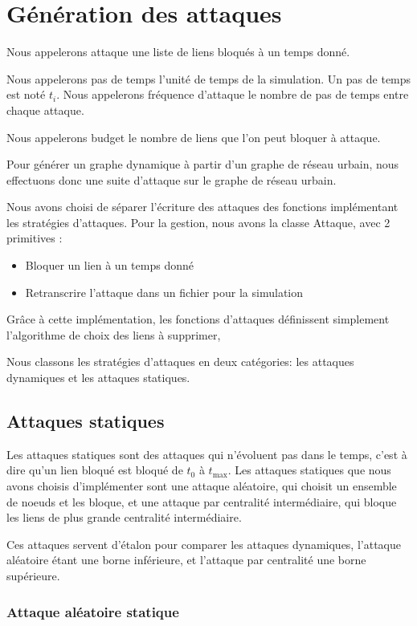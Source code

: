 \section{Génération des attaques}\label{sec:attaques}

Nous appelerons attaque une liste de liens bloqués à un temps donné.

Nous appelerons pas de temps l'unité de temps de la simulation. Un pas de temps est noté ${t_{i}}$. 
Nous appelerons fréquence d'attaque le nombre de pas de temps entre chaque attaque.

Nous appelerons budget le nombre de liens que l'on peut bloquer à attaque.

Pour générer un graphe dynamique à partir d'un graphe de réseau urbain, nous effectuons donc une suite d'attaque 
sur le graphe de réseau urbain.

Nous avons choisi de séparer l'écriture des attaques des fonctions implémentant les stratégies d'attaques.
Pour la gestion, nous avons la classe Attaque, avec 2 primitives :
\begin{itemize}
\item Bloquer un lien à un temps donné
\item Retranscrire l'attaque dans un fichier pour la simulation
\end{itemize}

Grâce à cette implémentation, les fonctions d'attaques définissent simplement l'algorithme de choix des liens à supprimer, 

Nous classons les stratégies d'attaques en deux catégories: les attaques dynamiques et les attaques statiques.
\subsection{Attaques statiques}\label{subsec:attaques_statiques}

Les attaques statiques sont des attaques qui n'évoluent pas dans le temps, c'est à dire qu'un lien bloqué est bloqué de ${t_{0}}$ à ${t_{\max}}$.
Les attaques statiques que nous avons choisis d'implémenter sont une attaque aléatoire, qui choisit un 
ensemble de noeuds et les bloque, et une attaque par centralité intermédiaire, qui bloque les liens de plus grande centralité intermédiaire.

Ces attaques servent d'étalon pour comparer les attaques dynamiques, l'attaque aléatoire étant une borne inférieure, et l'attaque par centralité une borne supérieure.

\subsubsection{Attaque aléatoire statique}\label{subsubsec:attaque_aleatoire_statique}

